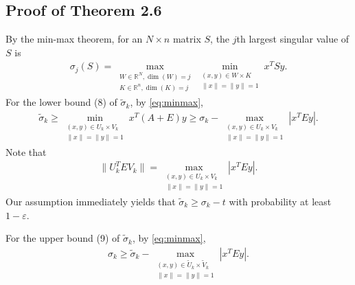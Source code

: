 \documentclass[reqno]{amsart}
\theoremstyle{plain}
\theoremstyle{definition}
\begin{document}
\subsection{Proof of Theorem 2.6}
By the min-max theorem, for an $N\times n$ matrix $S$, the $j$th largest singular value of $S$ is 
\begin{align}\label{eq:minmax}
\sigma_j(S) = \max_{ \substack{ W\in \mathbb R^N, \dim(W)=j \\ K \in \mathbb R^n, \dim(K)=j } } \min_{\substack{(x,y) \in W\times K \\ \|x\|=\|y\|=1} } x^T S y.
\end{align}
For the lower bound (8) of $\widetilde \sigma_k$, by \eqref{eq:minmax},
\begin{align*}
\widetilde \sigma_k \ge \min_{\substack{(x,y) \in U_k \times V_k \\ \|x\|=\|y\|=1} } x^T (A+E) y \ge \sigma_k - \max_{\substack{(x,y) \in U_k \times V_k \\ \|x\|=\|y\|=1} } |x^T E y|.
\end{align*}
Note that
\begin{align*}
\|U_k^T E V_k \|= \max_{\substack{(x,y) \in U_k \times V_k \\ \|x\|=\|y\|=1} } |x^T E y|.
\end{align*}
Our assumption immediately yields that $\widetilde \sigma_k \ge \sigma_k - t$ with probability at least $1-\varepsilon$.

For the upper bound (9) of $\widetilde \sigma_k$, by \eqref{eq:minmax},
\begin{align}\label{eq:lbd1}
\sigma_k \ge \widetilde \sigma_k - \max_{\substack{(x,y) \in \widetilde U_k \times \widetilde V_k \\ \|x\|=\|y\|=1} } |x^T E y|.
\end{align}
\end{document}
